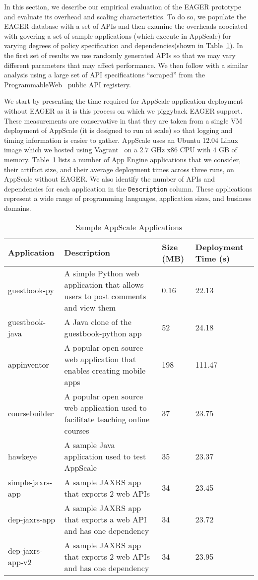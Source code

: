In this section, we describe our empirical evaluation of the EAGER
prototype and evaluate its overhead and scaling characteristics.
To do so, we populate the EAGER database with a set of APIs and then examine
the overheads aoociated with govering a set of sample applications (which
execute in AppScale) for varying degrees of policy specification and
dependencies(shown in Table~\ref{tab:sample_apps}).
In the first set of results we use randomly generated APIs so that we may vary
different parameters that may affect performance.  We then follow with a
similar analysis using a large
set of API specifications ``scraped'' from the ProgrammableWeb~\cite{pweb}
public API registery.
 
We start by presenting the time required for AppScale application deployment
without EAGER as it is this process on which we piggyback EAGER support.  
These measurements are conservative in that they are taken 
from a single VM deployment of AppScale (it is designed to run at scale) so that
logging and timing information is easier to gather.  AppScale uses an
Ubuntu 12.04 Linux image which we hosted using Vagrant~\cite{vagrant}    
on a $2.7$ GHz x86 CPU with $4$ GB of memory.
Table~\ref{tab:sample_apps} lists a number of App Engine
applications that we consider, their artifact size, and their average deployment times 
across three runs, on AppScale without EAGER.
We also identify the number of APIs and dependencies for each 
application in the \texttt{Description} column.
These applications represent a wide range of programming languages,
application sizes, and business domains.  

\begin{table}[t]
\begin{center}
\begin{tabular}{| p{1.5cm} | p{3.2cm} | p{0.5cm} | p{1.1cm} | }
\hline
Application & Description & Size (MB) & Deployment Time (s) \\ \hline
guestbook-py & A simple Python web application that allows users to post
comments and view them & 0.16 & 22.13 \\ \hline
guestbook-java & A Java clone of the guestbook-python app & 52 & 24.18 \\ \hline
appinventor & A popular open source web application that enables creating mobile apps & 198 & 111.47 \\ \hline
coursebuilder & A popular open source web application used to facilitate teaching online courses & 37 & 23.75 \\ \hline
hawkeye & A sample Java application used to test AppScale & 35 & 23.37 \\ \hline
simple-jaxrs-app & A sample JAXRS app that exports 2 web APIs & 34 & 23.45 \\ \hline
dep-jaxrs-app & A sample JAXRS app that exports a web API and has one dependency & 34 & 23.72 \\ \hline
dep-jaxrs-app-v2 & A sample JAXRS app that exports 2 web APIs and has one dependency & 34 & 23.95 \\ \hline
\end{tabular}
\end{center}
\caption{Sample AppScale Applications}
\label{tab:sample_apps}
\end{table}

